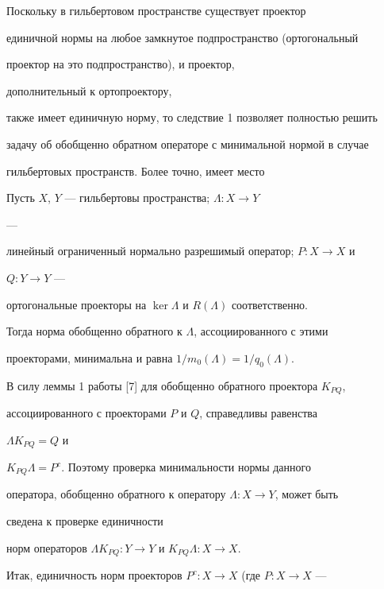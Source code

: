  


Поскольку в гильбертовом пространстве существует проектор 


единичной нормы на любое замкнутое подпространство (ортогональный 


проектор на это подпространство), и проектор, 


дополнительный к ортопроектору, 


также имеет единичную норму, то следствие 1 позволяет полностью решить 


задачу об обобщенно обратном операторе с минимальной нормой в случае 


гильбертовых пространств. Более точно, имеет место 


 


\begin{cor} Пусть $X$, $Y$ --- гильбертовы пространства; $\Lambda:X\to{}Y$ 


--- 


линейный ограниченный нормально разрешимый оператор; $P:X\to{}X$ и 


$Q:Y\to{}Y$ --- 


ортогональные проекторы на $\ker\Lambda$ и $R(\Lambda)$ соответственно. 


Тогда норма обобщенно обратного к $\Lambda$, ассоциированного с этими 


проекторами, минимальна и равна $1/m_0(\Lambda)=1/q_0(\Lambda)$. 


\end{cor} 


 


В силу леммы 1 работы [7] для обобщенно обратного проектора $K_{PQ}$, 


ассоциированного с проекторами $P$ и $Q$, справедливы равенства 


$\Lambda{}K_{PQ}=Q$ и 


$K_{PQ}\Lambda=P^c$. Поэтому проверка минимальности нормы данного 


оператора, обобщенно обратного к оператору $\Lambda:X\to{}Y$, может быть 


сведена к проверке единичности 


норм операторов $\Lambda{}K_{PQ}:Y\to{}Y$ и $K_{PQ}\Lambda:X\to{}X$. 


 


Итак, единичность норм проекторов $P^c:X\to{}X$ (где $P:X\to{}X$ --- 


